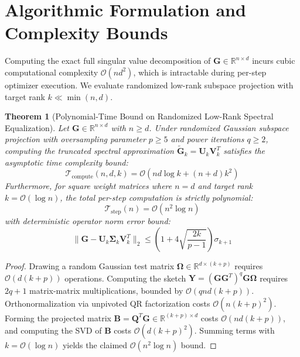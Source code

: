\documentclass[11pt,a4paper]{article}
\newcommand{\R}{\mathbb{R}}
\newtheorem{theorem}{Theorem}[section]
\theoremstyle{remark}
\begin{document}
\section{Algorithmic Formulation and Complexity Bounds}

Computing the exact full singular value decomposition of $\mathbf{G} \in \R^{n \times d}$ incurs cubic computational complexity $\mathcal{O}(n d^2)$, which is intractable during per-step optimizer execution. We evaluate randomized low-rank subspace projection with target rank $k \ll \min(n, d)$.

\begin{theorem}[Polynomial-Time Bound on Randomized Low-Rank Spectral Equalization]
Let $\mathbf{G} \in \R^{n \times d}$ with $n \ge d$. Under randomized Gaussian subspace projection with oversampling parameter $p \ge 5$ and power iterations $q \ge 2$, computing the truncated spectral approximation $\mathbf{\tilde{G}}_k = \mathbf{U}_k \mathbf{V}_k^T$ satisfies the asymptotic time complexity bound:
\begin{equation}
\mathcal{T}_{\text{compute}}(n, d, k) = \mathcal{O}(n d \log k + (n + d) k^2)
\end{equation}
Furthermore, for square weight matrices where $n = d$ and target rank $k = \mathcal{O}(\log n)$, the total per-step computation is strictly polynomial:
\begin{equation}
\mathcal{T}_{\text{step}}(n) = \mathcal{O}(n^2 \log n)
\end{equation}
with deterministic operator norm error bound:
\begin{equation}
\|\mathbf{G} - \mathbf{U}_k \mathbf{\Sigma}_k \mathbf{V}_k^T\|_2 \le \left(1 + 4 \sqrt{\frac{2 k}{p - 1}}\right) \sigma_{k+1}
\end{equation}
\end{theorem}

\begin{proof}
Drawing a random Gaussian test matrix $\mathbf{\Omega} \in \R^{d \times (k + p)}$ requires $\mathcal{O}(d(k+p))$ operations. Computing the sketch $\mathbf{Y} = (\mathbf{G} \mathbf{G}^T)^q \mathbf{G} \mathbf{\Omega}$ requires $2q + 1$ matrix-matrix multiplications, bounded by $\mathcal{O}(q n d (k + p))$. Orthonormalization via unpivoted QR factorization costs $\mathcal{O}(n (k + p)^2)$. Forming the projected matrix $\mathbf{B} = \mathbf{Q}^T \mathbf{G} \in \R^{(k+p) \times d}$ costs $\mathcal{O}(n d (k+p))$, and computing the SVD of $\mathbf{B}$ costs $\mathcal{O}(d (k+p)^2)$. Summing terms with $k = \mathcal{O}(\log n)$ yields the claimed $\mathcal{O}(n^2 \log n)$ bound.
\end{proof}
\end{document}
